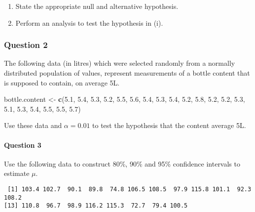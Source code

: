 \documentclass[]{article}
\newenvironment{Shaded}{\begin{snugshade}}{\end{snugshade}}
\newcommand{\FloatTok}[1]{\textcolor[rgb]{0.00,0.00,0.81}{#1}}
\newcommand{\KeywordTok}[1]{\textcolor[rgb]{0.13,0.29,0.53}{\textbf{#1}}}
\newcommand{\NormalTok}[1]{#1}
\newcommand{\StringTok}[1]{\textcolor[rgb]{0.31,0.60,0.02}{#1}}
\let\oldparagraph\paragraph
\renewcommand{\paragraph}[1]{\oldparagraph{#1}\mbox{}}
\begin{document}
\begin{enumerate}
\def\labelenumi{\roman{enumi}.}
\item
  State the appropriate null and alternative hypothesis.
\item
  Perform an analysis to test the hypothesis in (i).
\end{enumerate}

\hypertarget{question-2}{%
\subsubsection{Question 2}\label{question-2}}

The following data (in litres) which were selected randomly from a
normally distributed population of values, represent measurements of a
bottle content that is supposed to contain, on average 5L.

\begin{Shaded}
\begin{Highlighting}[]
\NormalTok{bottle.content <-}\StringTok{ }\KeywordTok{c}\NormalTok{(}\FloatTok{5.1}\NormalTok{, }\FloatTok{5.4}\NormalTok{, }\FloatTok{5.3}\NormalTok{, }\FloatTok{5.2}\NormalTok{, }\FloatTok{5.5}\NormalTok{, }\FloatTok{5.6}\NormalTok{, }\FloatTok{5.4}\NormalTok{, }\FloatTok{5.3}\NormalTok{, }\FloatTok{5.4}\NormalTok{, }\FloatTok{5.2}\NormalTok{,}
                    \FloatTok{5.8}\NormalTok{, }\FloatTok{5.2}\NormalTok{, }\FloatTok{5.2}\NormalTok{, }\FloatTok{5.3}\NormalTok{, }\FloatTok{5.1}\NormalTok{, }\FloatTok{5.3}\NormalTok{, }\FloatTok{5.4}\NormalTok{, }\FloatTok{5.5}\NormalTok{, }\FloatTok{5.5}\NormalTok{, }\FloatTok{5.7}\NormalTok{)}
\end{Highlighting}
\end{Shaded}

Use these data and \(\alpha=0.01\) to test the hypothesis that the
content average 5L.

\hypertarget{question-3}{%
\paragraph{Question 3}\label{question-3}}

Use the following data to construct 80\%, 90\% and 95\% confidence
intervals to estimate \(\mu\).

\begin{verbatim}
 [1] 103.4 102.7  90.1  89.8  74.8 106.5 108.5  97.9 115.8 101.1  92.3 108.2
[13] 110.8  96.7  98.9 116.2 115.3  72.7  79.4 100.5
\end{verbatim}
\end{document}
